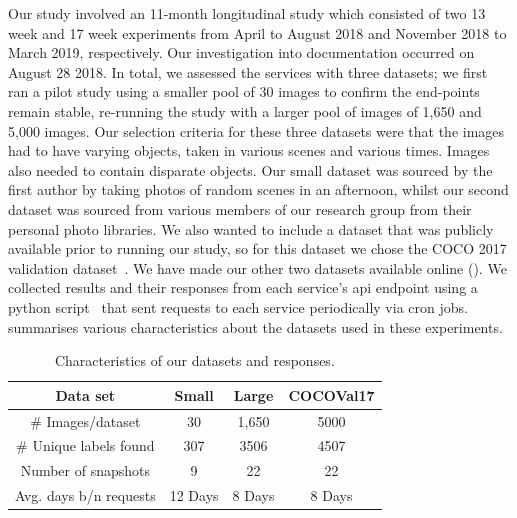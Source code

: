 Our study involved an 11-month longitudinal study which consisted of two 13 week and 17 week experiments from April to August 2018 and November 2018 to March 2019, respectively. Our investigation into documentation occurred on August 28 2018. In total, we assessed the services with three datasets; we first ran a pilot study using a smaller pool of 30 images to confirm the end-points remain stable, re-running the study with a larger pool of images of 1,650 and 5,000 images. Our selection criteria for these three datasets were that the images had to have varying objects, taken in various scenes and various times. Images also needed to contain disparate objects. Our small dataset was sourced by the first author by taking photos of random scenes in an afternoon, whilst our second dataset was sourced from various members of our research group from their personal photo libraries. We also wanted to include a dataset that was publicly available prior to running our study, so for this dataset we chose the COCO 2017 validation dataset~\citep{Lin:2014vma}. We have made our other two datasets available online (). We collected results and their responses from each service's \gls{api} endpoint  using a  python script~ that sent requests to each service periodically via cron jobs.  summarises various characteristics about the datasets used in these experiments.

\begin{table}[t]
\caption[Characteristics of data in computer vision evolution assessment]{Characteristics of our datasets and responses.}
\label{icsme2019:tab:dataset}
\centering
\begin{tabular}{c||c|c|c}
  \toprule
  \textbf{Data set} & \textbf{Small} & \textbf{Large} & \textbf{COCOVal17} \\
  \midrule
  \# Images/dataset & 30 & 1,650 & 5000 \\
  \# Unique labels found & 307 & 3506 & 4507\\
  Number of snapshots & 9 & 22 & 22 \\
  Avg. days b/n requests & 12 Days & 8 Days & 8 Days \\
  \bottomrule
\end{tabular}
\end{table}


